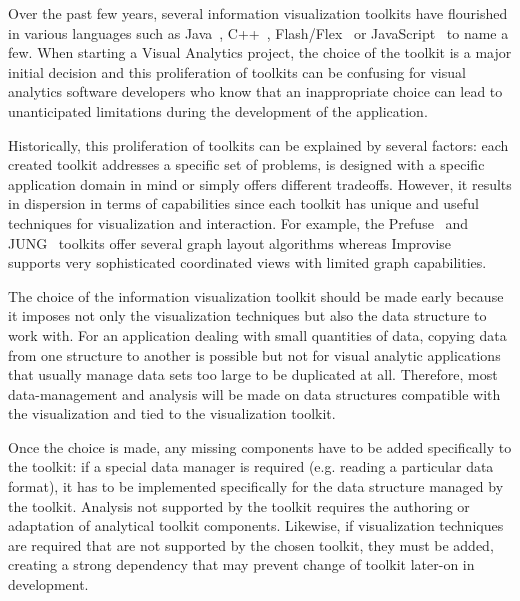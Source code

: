 
Over the past few years, several information visualization toolkits
have flourished in various languages such as Java~\cite{InfoVis,
  Prefuse, jung2003, Improvise,Discovery2}, C++~\cite{Tulip,ADVIZOR},
Flash/Flex~\cite{flare,Axiis} or JavaScript~\cite{thejit,Protovis} to
name a few.  When starting a Visual Analytics project, the choice of
the toolkit is a major initial decision and this proliferation of
toolkits can be confusing for visual analytics software developers who
know that an inappropriate choice can lead to unanticipated
limitations during the development of the application.

Historically, this proliferation of toolkits can be explained by
several factors: each created toolkit addresses a specific set of
problems, is designed with a specific application domain in mind or
simply offers different tradeoffs.  However, it results in dispersion
in terms of capabilities since each toolkit has unique and useful
techniques for visualization and interaction.  For example, the
Prefuse~\cite{Prefuse} and JUNG~\cite{jung2003} toolkits offer several
graph layout algorithms whereas Improvise~\cite{Improvise} supports
very sophisticated coordinated views with limited graph capabilities.

The choice of the information visualization toolkit should be made
early because it imposes not only the visualization techniques but
also the data structure to work with.  For an application dealing with
small quantities of data, copying data from one structure to another
is possible but not for visual analytic applications that usually
manage data sets too large to be duplicated at all.  Therefore, most
data-management and analysis will be made on data structures
compatible with the visualization and tied to the visualization
toolkit.


Once the choice is made, any missing components have to be
added specifically to the toolkit: if a special data manager is
required (e.g. reading a particular data format), it has to be
implemented specifically for the data structure managed by the
toolkit. Analysis not supported by the toolkit requires the authoring
or adaptation of analytical toolkit components. Likewise, if visualization
techniques are required that are not supported by the chosen toolkit,
they must be added, creating a strong dependency that may prevent
change of toolkit later-on in development.

